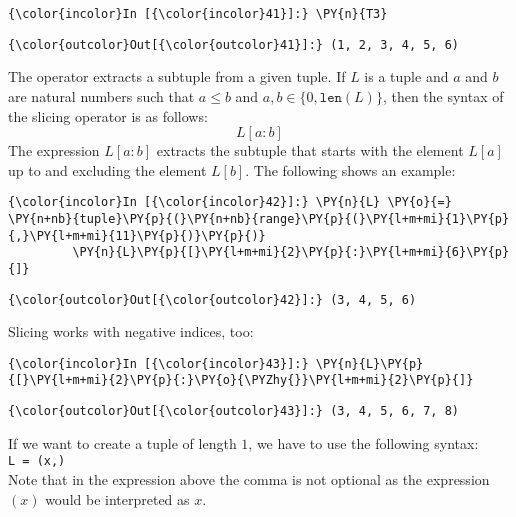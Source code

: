 \begin{Verbatim}[commandchars=\\\{\}]
{\color{incolor}In [{\color{incolor}41}]:} \PY{n}{T3}
\end{Verbatim}

\begin{Verbatim}[commandchars=\\\{\}]
{\color{outcolor}Out[{\color{outcolor}41}]:} (1, 2, 3, 4, 5, 6)
\end{Verbatim}
            
The  
operator extracts a subtuple from a given tuple. If
\(L\) is a tuple and \(a\) and \(b\) are natural numbers such that
\(a \leq b\) and \(a,b \in \{0, \texttt{len}(L) \}\), then the syntax of
the slicing operator is as follows: \[ L[a:b] \] The expression
\(L[a:b]\) extracts the subtuple that starts with the element \(L[a]\)
up to and excluding the element \(L[b]\). The following shows an
example:

\begin{Verbatim}[commandchars=\\\{\}]
{\color{incolor}In [{\color{incolor}42}]:} \PY{n}{L} \PY{o}{=} \PY{n+nb}{tuple}\PY{p}{(}\PY{n+nb}{range}\PY{p}{(}\PY{l+m+mi}{1}\PY{p}{,}\PY{l+m+mi}{11}\PY{p}{)}\PY{p}{)}
         \PY{n}{L}\PY{p}{[}\PY{l+m+mi}{2}\PY{p}{:}\PY{l+m+mi}{6}\PY{p}{]}
\end{Verbatim}


\begin{Verbatim}[commandchars=\\\{\}]
{\color{outcolor}Out[{\color{outcolor}42}]:} (3, 4, 5, 6)
\end{Verbatim}
            
Slicing works with negative indices, too:

\begin{Verbatim}[commandchars=\\\{\}]
{\color{incolor}In [{\color{incolor}43}]:} \PY{n}{L}\PY{p}{[}\PY{l+m+mi}{2}\PY{p}{:}\PY{o}{\PYZhy{}}\PY{l+m+mi}{2}\PY{p}{]}
\end{Verbatim}

\begin{Verbatim}[commandchars=\\\{\}]
{\color{outcolor}Out[{\color{outcolor}43}]:} (3, 4, 5, 6, 7, 8)
\end{Verbatim}
If we want to create a tuple of length  $1$, we have to use the following syntax:
\\[0.2cm]
\hspace*{1.3cm}
\texttt{L = (x,)}
\\[0.2cm]
Note that in the expression above the comma is not optional as the expression $(x)$ would be interpreted as 
$x$. 

